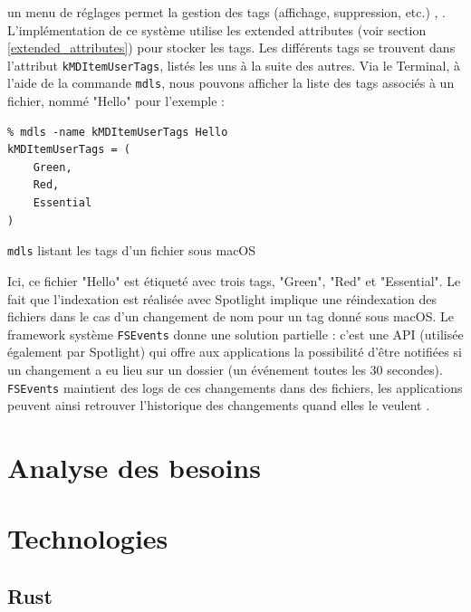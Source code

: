 \documentclass[a4paper, 12pt]{article}
\newenvironment{code}{\captionsetup{type=listing}}{}
\begin{document}
un menu de réglages permet la gestion des tags (affichage, suppression, etc.) \cite{ref5}, 
\cite{ref6}. L'implémentation de ce système utilise les extended attributes (voir section 
\ref{extended_attributes}) pour stocker les tags. Les différents tags se trouvent dans l'attribut 
\texttt{kMDItemUserTags}, listés les uns à la suite des autres. Via le Terminal, à 
l'aide de la commande \texttt{mdls}, nous pouvons afficher la liste des tags associés à 
un fichier, nommé "Hello" pour l'exemple :
\begin{code}
    \begin{verbatim}
% mdls -name kMDItemUserTags Hello 
kMDItemUserTags = (
    Green,
    Red,
    Essential
)
    \end{verbatim}
    \caption{\texttt{mdls} listant les tags d'un fichier sous macOS \cite{ref7}}
\end{code}
\bigbreak
Ici, ce fichier "Hello" est étiqueté avec trois tags, "Green", "Red" et "Essential". Le fait que 
l'indexation est réalisée avec Spotlight implique une réindexation des fichiers dans le cas d'un 
changement de nom pour un tag donné sous macOS. Le framework système \texttt{FSEvents} 
donne une solution partielle : c'est une API (utilisée également par Spotlight) qui offre aux 
applications la possibilité d'être notifiées si un changement a eu lieu sur un dossier (un événement 
toutes les 30 secondes). \texttt{FSEvents} maintient des logs de ces changements dans 
des fichiers, les applications peuvent ainsi retrouver l'historique des changements quand elles 
le veulent \cite{ref10}.


\section{Analyse des besoins} %
\cite{ref3}



\section{Technologies} %
\subsection{Rust}
\cite{ref0} \cite{ref1} \cite{ref2}
\end{document}
